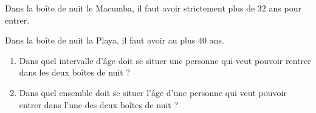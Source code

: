 \begin{exo}{}
	Dans la boîte de nuit le Macumba, il faut avoir strictement plus de $32$ ans pour entrer.

	Dans la boîte de nuit la Playa, il faut avoir au plus $40$ ans.
	\begin{enumerate}
		\item Dans quel intervalle d'âge doit se situer une personne qui veut pouvoir rentrer dans les deux boîtes de nuit ?
		\item Dans quel ensemble doit se situer l'âge d'une personne qui veut pouvoir entrer dans l'une des deux boîtes de nuit ?
	\end{enumerate}
\end{exo}
